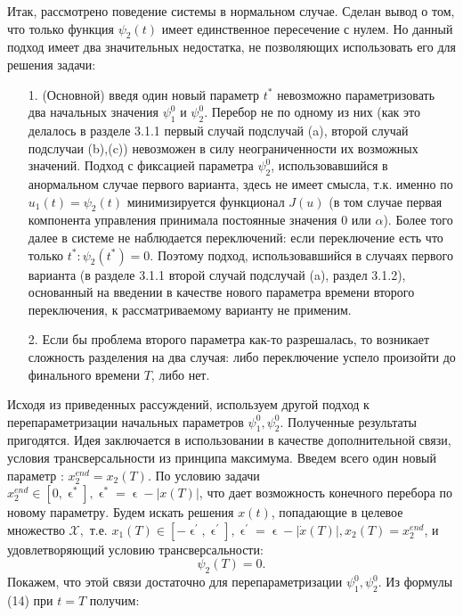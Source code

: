 \documentclass[11pt]{article}
\begin{document}
{{{Итак, рассмотрено поведение системы в нормальном случае. Сделан вывод о том, что  только функция $\psi_2(t)$ имеет единственное пересечение с нулем. Но данный подход имеет два значительных недостатка, не позволяющих использовать его для решения задачи:
\begin{itemize}
	\item [1.]{(Основной) введя один новый параметр $t^*$ невозможно параметризовать два начальных значения $\psi_1^0$ и $\psi_2^0$. Перебор не по одному из них (как это делалось в разделе 3.1.1 первый случай подслучай (a), второй случай подслучаи (b),(c)) невозможен в силу неограниченности их возможных значений. Подход с фиксацией параметра $\psi_2^0$, использовавшийся в анормальном случае первого варианта, здесь не имеет смысла, т.к. именно по $u_1(t) = \psi_2(t)$ минимизируется функционал $J(u)$ (в том случае первая компонента управления принимала постоянные значения 0 или $\alpha$). Более того далее в системе не наблюдается переключений: если переключение есть что только $t^*: \psi_2(t^*) = 0.$ Поэтому подход, использовавшийся в случаях первого варианта (в разделе 3.1.1 второй случай подслучай (a), раздел 3.1.2), основанный на введении в качестве нового параметра времени второго переключения, к рассматриваемому варианту не применим.} 
	\item [2.]{Если бы проблема второго параметра как-то разрешалась, то возникает сложность разделения на два случая: либо переключение успело произойти до финального времени $T$, либо нет. }
\end{itemize}
Исходя из приведенных рассуждений, используем другой подход к перепараметризации начальных параметров $\psi_1^0,\psi_2^0.$ Полученные результаты пригодятся. Идея заключается в использовании в качестве дополнительной связи, условия трансверсальности из принципа максимума.
\newline
Введем всего один новый параметр : $x_2^{end} = x_2(T).$ По условию задачи $x_2^{end} \in [0,\upvarepsilon^*],\upvarepsilon^* = \upvarepsilon - |x(T)|$, что дает возможность конечного перебора по новому параметру. Будем искать решения $x(t)$, попадающие в целевое множество $\mathcal{X},$ т.е. $x_1(T) \in [-\upvarepsilon^{'},\upvarepsilon^{'}], \upvarepsilon^{'} = \upvarepsilon - |\dot{x}(T)|, x_2(T) = x_2^{end}$, и удовлетворяющий условию трансверсальности:
\[ \psi_2(T) = 0. \]
Покажем, что этой связи достаточно для перепараметризации $\psi_1^0,\psi_2^0$.
\newline
Из формулы (14) при $t = T$ получим:
\begin{equation}

\end{equation}}}}
\end{document}
